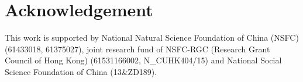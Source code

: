 \documentclass[a4paper]{article}
\begin{document}
\section{Acknowledgement}
\label{sec:acknowledgement}

This work is supported by National Natural Science Foundation of China (NSFC) (61433018, 61375027), joint research fund of NSFC-RGC (Research Grant Council of Hong Kong) (61531166002, N\_CUHK404/15) and National Social Science Foundation of China (13\&ZD189).




\end{document}
